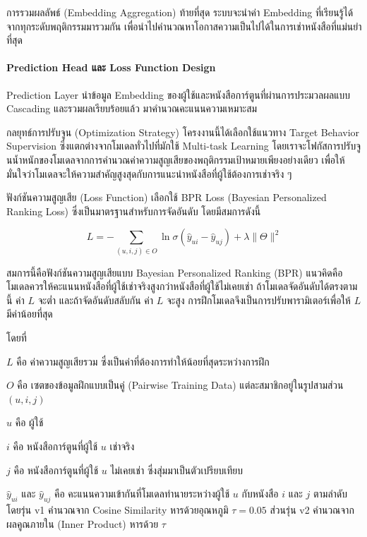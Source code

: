 การรวมผลลัพธ์ (Embedding Aggregation) ท้ายที่สุด ระบบจะนำค่า Embedding ที่เรียนรู้ได้จากทุกระดับพฤติกรรมมารวมกัน เพื่อนำไปคำนวณหาโอกาสความเป็นไปได้ในการเช่าหนังสือที่แม่นยำที่สุด

\paragraph{Prediction Head และ Loss Function Design}

Prediction Layer นำข้อมูล Embedding ของผู้ใช้และหนังสือการ์ตูนที่ผ่านการประมวลผลแบบ Cascading และรวมผลเรียบร้อยแล้ว มาคำนวณคะแนนความเหมาะสม 

กลยุทธ์การปรับจูน (Optimization Strategy) โครงงานนี้ได้เลือกใช้แนวทาง Target Behavior Supervision ซึ่งแตกต่างจากโมเดลทั่วไปที่มักใช้ Multi-task Learning โดยเราจะโฟกัสการปรับจูนน้ำหนักของโมเดลจากการคำนวณค่าความสูญเสียของพฤติกรรมเป้าหมายเพียงอย่างเดียว เพื่อให้มั่นใจว่าโมเดลจะให้ความสำคัญสูงสุดกับการแนะนำหนังสือที่ผู้ใช้ต้องการเช่าจริง ๆ

ฟังก์ชันความสูญเสีย (Loss Function) เลือกใช้ BPR Loss (Bayesian Personalized Ranking Loss) ซึ่งเป็นมาตรฐานสำหรับการจัดอันดับ โดยมีสมการดังนี้

\bigskip
\begin{equation}
L = -\sum_{(u,i,j)\in O}
\ln \sigma \left(\hat{y}_{ui}-\hat{y}_{uj}\right)
+ \lambda \|\Theta\|^2
\end{equation}

สมการนี้คือฟังก์ชันความสูญเสียแบบ Bayesian Personalized Ranking (BPR) แนวคิดคือ โมเดลควรให้คะแนนหนังสือที่ผู้ใช้เช่าจริงสูงกว่าหนังสือที่ผู้ใช้ไม่เคยเช่า ถ้าโมเดลจัดอันดับได้ตรงตามนี้ ค่า $L$ จะต่ำ และถ้าจัดอันดับสลับกัน ค่า $L$ จะสูง การฝึกโมเดลจึงเป็นการปรับพารามิเตอร์เพื่อให้ $L$ มีค่าน้อยที่สุด

\noindent โดยที่

\begingroup
\setlength{\parindent}{0pt}
\setlength{\parskip}{0.5em}

$L$ คือ ค่าความสูญเสียรวม ซึ่งเป็นค่าที่ต้องการทำให้น้อยที่สุดระหว่างการฝึก

$O$ คือ เซตของข้อมูลฝึกแบบเป็นคู่ (Pairwise Training Data) แต่ละสมาชิกอยู่ในรูปสามส่วน $(u, i, j)$

$u$ คือ ผู้ใช้

$i$ คือ หนังสือการ์ตูนที่ผู้ใช้ $u$ เช่าจริง 

$j$ คือ หนังสือการ์ตูนที่ผู้ใช้ $u$ ไม่เคยเช่า ซึ่งสุ่มมาเป็นตัวเปรียบเทียบ

$\hat{y}_{ui}$ และ $\hat{y}_{uj}$ คือ คะแนนความเข้ากันที่โมเดลทำนายระหว่างผู้ใช้ $u$ กับหนังสือ $i$ และ $j$ ตามลำดับ โดยรุ่น v1 คำนวณจาก Cosine Similarity หารด้วยอุณหภูมิ $\tau = 0.05$ ส่วนรุ่น v2 คำนวณจากผลคูณภายใน (Inner Product) หารด้วย $\tau$ 

